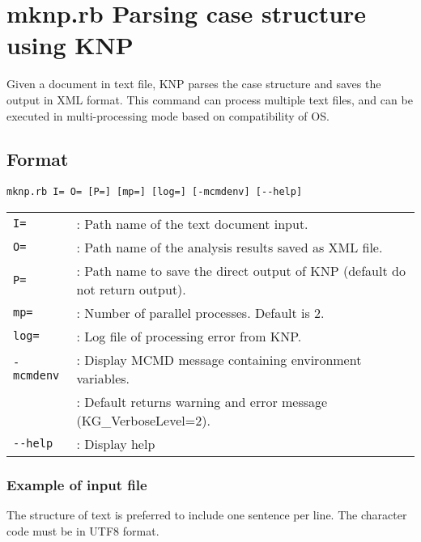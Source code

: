 



\section{mknp.rb Parsing case structure using KNP \label{sect:mknp}}

Given a document in text file, KNP parses the case structure and saves the output in XML format. 
This command can process multiple text files, and can be executed in multi-processing mode based on compatibility of OS. 


\subsection{Format}
\begin{verbatim}
mknp.rb I= O= [P=] [mp=] [log=] [-mcmdenv] [--help]
\end{verbatim}

\begin{table}[htbp]
{\small
\begin{tabular}{ll}
\verb|I=|       & : Path name of the text document input. \\
\verb|O=|       & : Path name of the analysis results saved as XML file.   \\
\verb|P=|       & : Path name to save the direct output of KNP (default do not return output).  \\
\verb|mp=|      & : Number of parallel processes.  Default is 2.   \\
\verb|log=|     & :  Log file of processing error from KNP.  \\
\verb|-mcmdenv| & : Display MCMD message containing environment variables.  \\
                & :  Default returns warning and error message  (KG\_VerboseLevel=2). \\  
\verb|--help|    & : Display help  \\
\end{tabular} 
}
\end{table} 


\subsubsection*{Example of input file} 

The structure of text is preferred to include one sentence per line. 
The character code must be in UTF8 format. 

